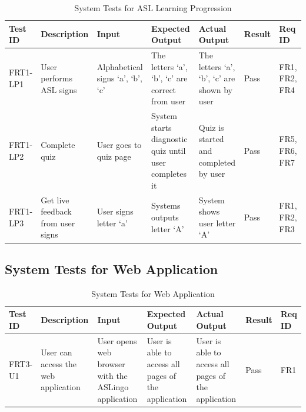 \documentclass[12pt, titlepage]{article}
\begin{document}
\begin{longtable}{|p{1cm}|p{2.25cm}|p{3cm}|p{3cm}|p{1.75cm}|p{1.25cm}|p{1cm}|}
  \caption{System Tests for ASL Learning Progression} \\
  \hline
  \textbf{Test ID} & \textbf{Description} & \textbf{Input} & \textbf{Expected Output} & \textbf{Actual Output} & \textbf{Result} & \textbf{Req ID}\\
  \hline
  FRT1-LP1 & User performs ASL signs & Alphabetical signs `a', `b', `c' & The letters `a', `b', `c' are correct from user & The letters `a', `b', `c' are shown by user & Pass & FR1, FR2, FR4\\
  \hline
  FRT1-LP2 & Complete quiz & User goes to quiz page & System starts diagnostic quiz until user completes it & Quiz is started and completed by user & Pass & FR5, FR6, FR7 \\
  \hline
  FRT1-LP3 & Get live feedback from user signs & User signs letter `a' & Systems outputs letter `A' & System shows user letter `A' & Pass & FR1, FR2, FR3 \\
  \bottomrule
  \end{longtable}

\subsection{System Tests for Web Application}
\begin{longtable}{|p{1cm}|p{2.5cm}|p{2cm}|p{2cm}|p{2cm}|p{1.5cm}|p{1cm}|}
\caption{System Tests for Web Application} \\
\hline
\textbf{Test ID} & \textbf{Description} & \textbf{Input} & \textbf{Expected Output} & \textbf{Actual Output} & \textbf{Result} & \textbf{Req ID}\\
\hline
FRT3-U1 & User can access the web application & User opens web browser with the ASLingo application & User is able to access all pages of the application & User is able to access all pages of the application & Pass & FR1 \\
\bottomrule
\end{longtable}
\end{document}
